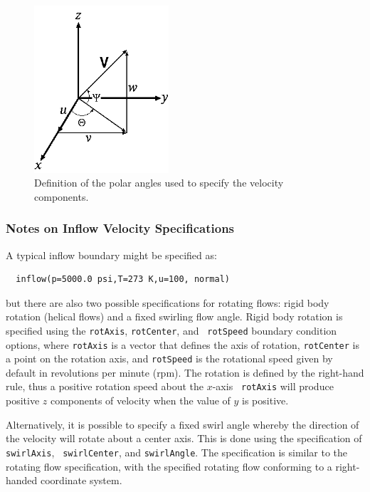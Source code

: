 \documentclass{article}
\begin{document}
\begin{figure}[htbp]
\begin{center}
\includegraphics[width=5cm]{polar}
\caption{Definition of the polar angles used to specify the velocity components.}
\label{polar}
\end{center}
\end{figure}



\subsubsection{ Notes on Inflow Velocity Specifications}

A typical inflow boundary might be specified as:
\begin{verbatim}
  inflow(p=5000.0 psi,T=273 K,u=100, normal)
\end{verbatim}
but there are also two possible specifications for rotating flows: rigid body rotation
(helical flows) and a fixed swirling flow angle.  Rigid body rotation
is specified using the {\tt rotAxis}, {\tt rotCenter}, and {\tt
rotSpeed} boundary condition options, where {\tt rotAxis} is a vector
that defines the axis of rotation, {\tt rotCenter} is a point on the
rotation axis, and {\tt rotSpeed} is the rotational speed given by
default in revolutions per minute (rpm).  The rotation is defined by the
right-hand rule, thus a positive rotation speed about the $x$-axis {\tt
rotAxis} will produce positive $z$ components of velocity when the value
of $y$ is positive.

Alternatively, it is possible to specify a fixed swirl angle whereby
the direction of the velocity will rotate about a center axis.  This
is done using the specification of {\tt swirlAxis}, {\tt
swirlCenter}, and {\tt swirlAngle}.  The specification is similar to
the rotating flow specification, with the specified rotating flow
conforming to a right-handed coordinate system.
\end{document}
